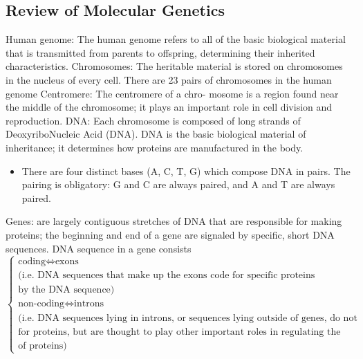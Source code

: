\documentclass[a4paper,twoside,11pt]{article}
\begin{document}
\subsection{Review of Molecular Genetics}
\textcolor{NavyBlue}{Human genome: }The human genome refers to all of the basic biological material that is transmitted from parents to offspring, determining their inherited characteristics.
\newline
\newline
\textcolor{NavyBlue}{Chromosomes: }The heritable material is stored on chromosomes in the nucleus of every cell. There are 23 pairs of chromosomes in the human genome
\newline
\newline
\textcolor{NavyBlue}{Centromere: }The centromere of a chro- mosome is a region found near the middle of the chromosome; it plays an important role in cell division and reproduction.
\newline
\newline
\textcolor{NavyBlue}{DNA: }Each chromosome is composed of long strands of DeoxyriboNucleic Acid (DNA). DNA is the basic biological material of inheritance; it determines how proteins are manufactured in the body.
\begin{itemize}
    \item There are four distinct bases (A, C, T, G) which compose DNA in pairs. The pairing is obligatory: G and C are always paired, and A and T are always paired.
\end{itemize}
\textcolor{NavyBlue}{Genes: }are largely contiguous stretches of DNA that are responsible for making proteins; the beginning and end of a gene are signaled by specific, short DNA sequences. 
\newline
\newline
DNA sequence in a gene consists $\begin{cases} 
\text{coding} \Leftrightarrow \text{exons} \\ (\text{i.e. DNA sequences that make up the exons code for specific proteins determined} \\
\text{by the DNA sequence})
\\
\text{non-coding} \Leftrightarrow \text{introns} \\ \text{(i.e. DNA sequences lying in introns, or sequences lying outside of genes, do not code }\\
\text{for proteins, but are thought to play other important roles in regulating the manufacture} \\
\text{of proteins})
\end{cases}$
\end{document}
